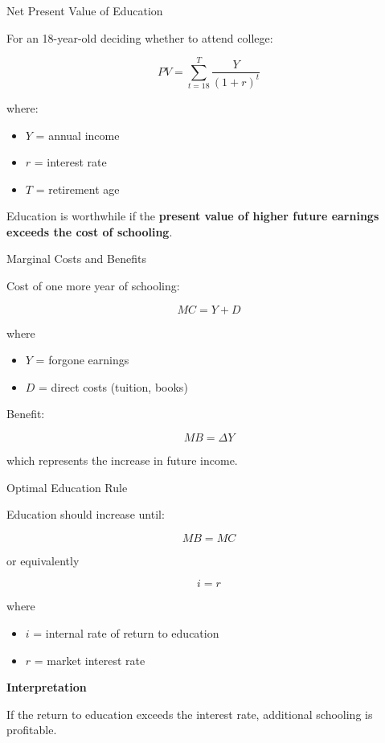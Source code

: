 \documentclass[aspectratio=169]{beamer}
\begin{document}
\begin{frame}{Net Present Value of Education}

For an 18-year-old deciding whether to attend college:

\[
PV = \sum_{t=18}^{T} \frac{Y}{(1+r)^t}
\]

where:

\begin{itemize}
\item $Y$ = annual income
\item $r$ = interest rate
\item $T$ = retirement age
\end{itemize}

Education is worthwhile if the \textbf{present value of higher future earnings exceeds the cost of schooling}.
\end{frame}

\begin{frame}{Marginal Costs and Benefits}

Cost of one more year of schooling:

\[
MC = Y + D
\]

where

\begin{itemize}
\item $Y$ = forgone earnings
\item $D$ = direct costs (tuition, books)
\end{itemize}

Benefit:

\[
MB = \Delta Y
\]

which represents the increase in future income.
\end{frame}

\begin{frame}{Optimal Education Rule}

Education should increase until:

\[
MB = MC
\]

or equivalently

\[
i = r
\]

where

\begin{itemize}
\item $i$ = internal rate of return to education
\item $r$ = market interest rate
\end{itemize}

\textbf{Interpretation}

If the return to education exceeds the interest rate, additional schooling is profitable.
\end{frame}
\end{document}
